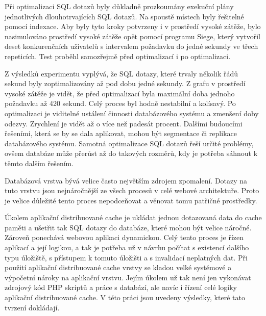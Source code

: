 \documentclass[12pt]{article}
\begin{document}
Při optimalizaci SQL dotazů byly důkladně prozkoumány exekuční plány jednotlivých dlouhotrvajících SQL dotazů. Na spoustě místech byly řešitelné pomocí indexace. Aby byly tyto kroky potvrzeny i v prostředí vysoké zátěže, bylo nasimulováno prostředí vysoké zátěže opět pomocí programu Siege, který vytvořil deset konkurenčních uživatelů s intervalem požadavku do jedné sekundy ve třech repeticích. Test proběhl samozřejmě před optimalizací i po optimalizaci.

Z výsledků experimentu vyplývá, že SQL dotazy, které trvaly několik řádů sekund byly zoptimalizovány až pod dobu jedné sekundy. Z grafu v prostředí vysoké zátěže je vidět, že před optimalizací byla maximální doba jednoho požadavku až 420 sekund. Celý proces byl hodně nestabilní a kolísavý. Po optimalizaci je viditelné ustálení činnosti databázového systému a zmenšení doby odezvy. Zrychlení je vidět až o více než padesát procent. Dalšími budoucími řešeními, která se by se dala aplikovat, mohou být segmentace či replikace databázového systému. Samotná optimalizace SQL dotazů řeší určité problémy, ovšem databáze může přerůst až do takových rozměrů, kdy je potřeba sáhnout k těmto dalším řešením.

Databázová vrstva bývá velice často největším zdrojem zpomalení. Dotazy na tuto vrstvu jsou nejnáročnější ze všech procesů v celé webové architektuře. Proto je velice důležité tento proces nepodceňovat a věnovat tomu patřičné prostředky.

\obrazek
{}

\obrazek
{}

\clearpage

\obrazek
{}


\obrazek
{}


\label{sec:memcached}
Úkolem aplikační distribuované cache je ukládat jednou dotazovaná data do cache paměti a ušetřit tak SQL dotazy do databáze, které mohou být velice náročné. Zároveň ponechává webovou aplikaci dynamickou. Celý tento proces je řízen aplikací a její logikou, a tak je potřeba už v návrhu počítat s existencí dalšího typu úložiště, s přístupem k tomuto úložišti a s invalidací neplatných dat. Při použití aplikační distribuované cache vrstvy se kladou velké systémové a výpočetní nároky na aplikační vrstvu. Jejím úkolem už tak není jen vykonávat zdrojový kód PHP skriptů a práce s databází, ale navíc i řízení celé logiky aplikační distribuované cache. V této práci jsou uvedeny výsledky, které tato tvrzení dokládají.
\end{document}
